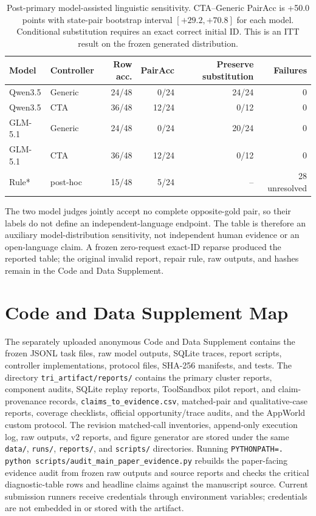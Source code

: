 \documentclass[10pt]{article}
\begin{document}
\begin{table}[H]
\centering
\small
\begin{tabular}{llrrrr}
\toprule
Model & Controller & Row acc. & PairAcc & Preserve substitution & Failures \\
\midrule
Qwen3.5 & Generic & 24/48 & 0/24 & 24/24 & 0 \\
Qwen3.5 & CTA & 36/48 & 12/24 & 0/12 & 0 \\
GLM-5.1 & Generic & 24/48 & 0/24 & 20/24 & 0 \\
GLM-5.1 & CTA & 36/48 & 12/24 & 0/12 & 0 \\
Rule* & post-hoc & 15/48 & 5/24 & -- & 28 unresolved \\
\bottomrule
\end{tabular}
\caption{Post-primary model-assisted linguistic sensitivity. CTA--Generic PairAcc is +50.0 points with
state-pair bootstrap interval $[+29.2,+70.8]$ for each model. Conditional substitution requires
an exact correct initial ID. This is an ITT result on the frozen generated distribution.}
\end{table}

The two model judges jointly accept no complete opposite-gold pair, so their labels do not define an
independent-language endpoint. The table is therefore an auxiliary model-distribution sensitivity,
not independent human evidence or an open-language claim. A frozen zero-request exact-ID reparse
produced the reported table; the original invalid report, repair rule, raw outputs, and hashes remain
in the Code and Data Supplement.

\section{Code and Data Supplement Map}
\enlargethispage{2\baselineskip}
The separately uploaded anonymous Code and Data Supplement contains the frozen JSONL task files,
raw model outputs, SQLite traces, report scripts, controller implementations, protocol files,
SHA-256 manifests, and tests. The directory \texttt{tri\_artifact/reports/} contains the primary
cluster reports, component audits, SQLite replay reports, ToolSandbox pilot report, and
claim-provenance records, \texttt{claims\_to\_evidence.csv}, matched-pair and qualitative-case reports, coverage checklists,
official opportunity/trace audits, and the AppWorld custom protocol.
The revision matched-call inventories, append-only execution log, raw outputs, v2 reports, and
figure generator are stored under the same \texttt{data/}, \texttt{runs/}, \texttt{reports/}, and
\texttt{scripts/} directories.
Running \texttt{PYTHONPATH=. python scripts/audit\_main\_paper\_evidence.py} rebuilds the
paper-facing evidence audit from frozen raw outputs and source reports and checks the critical
diagnostic-table rows and headline claims against the manuscript source.
Current submission runners receive credentials through environment
variables; credentials are not embedded in or stored with the artifact.
\end{document}
